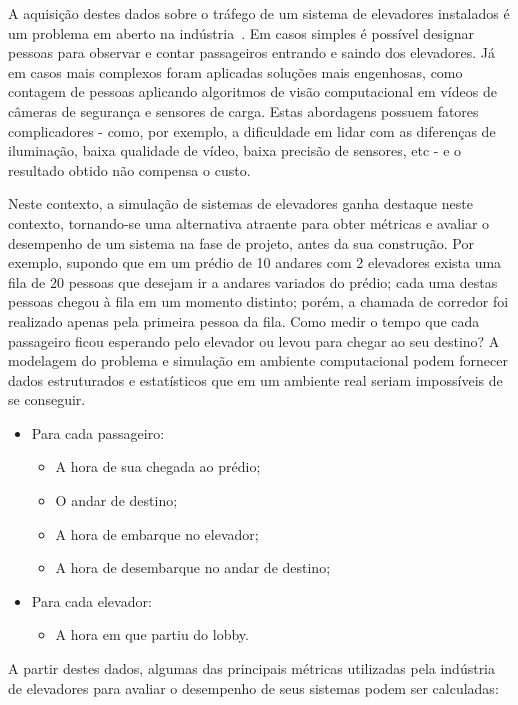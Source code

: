 A aquisição destes dados sobre o tráfego de um sistema de elevadores instalados é um problema em aberto na indústria~\cite{KOEHLEROTTIGER02}. Em casos simples é possível designar pessoas para observar e contar passageiros entrando e saindo dos elevadores. Já em casos mais complexos foram aplicadas soluções mais engenhosas, como contagem de pessoas aplicando algoritmos de visão computacional em vídeos de câmeras de segurança e sensores de carga. Estas abordagens possuem fatores complicadores - como, por exemplo, a dificuldade em lidar com as diferenças de iluminação, baixa qualidade de vídeo, baixa precisão de sensores, etc - e o resultado obtido não compensa o custo.

Neste contexto, a simulação de sistemas de elevadores ganha destaque neste contexto, tornando-se uma alternativa atraente para obter métricas e avaliar o desempenho de um sistema na fase de projeto, antes da sua construção. Por exemplo, supondo que em um prédio de 10 andares com 2 elevadores exista uma fila de 20 pessoas que desejam ir a andares variados do prédio; cada uma destas pessoas chegou à fila em um momento distinto; porém, a chamada de corredor foi realizado apenas pela primeira pessoa da fila. Como medir o tempo que cada passageiro ficou esperando pelo elevador ou levou para chegar ao seu destino? A modelagem do problema e simulação em ambiente computacional podem fornecer dados estruturados e estatísticos que em um ambiente real seriam impossíveis de se conseguir.

\begin{itemize}
  \item Para cada passageiro:
  \begin{itemize}
    \item A hora de sua chegada ao prédio;
    \item O andar de destino;
    \item A hora de embarque no elevador;
    \item A hora de desembarque no andar de destino;
  \end{itemize}
  \item Para cada elevador:
  \begin{itemize}
    \item A hora em que partiu do lobby.
  \end{itemize}
\end{itemize}

A partir destes dados, algumas das principais métricas utilizadas pela indústria de elevadores para avaliar o desempenho de seus sistemas podem ser calculadas:


